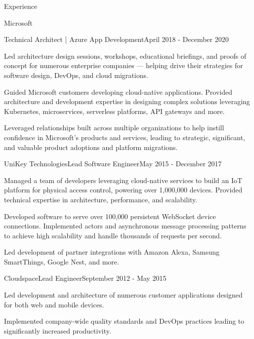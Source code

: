 \documentclass{resume} %
\begin{document}
\begin{rSection}{Experience}
\begin{rSubsection}{Microsoft}{}{}
\begin{rSubSubsection}{Technical Architect | Azure App Development}{April 2018 - December 2020}{}{}
        \item Led architecture design sessions, workshops, educational briefings, and proofs of concept for numerous enterprise companies --- helping drive their strategies for software design, DevOps, and cloud migrations.
        \item Guided Microsoft customers developing cloud-native applications.  Provided architecture and development expertise in designing complex solutions leveraging Kubernetes, microservices, serverless platforms, API gateways and more.
        \item Leveraged relationships built across multiple organizations to help instill confidence in Microsoft's products and services, leading to strategic, significant, and valuable product adoptions and platform migrations.
        
    \end{rSubSubsection}
    
    
\end{rSubsection}


\begin{rSubsection}{UniKey Technologies}{Lead Software Engineer}{May 2015 - December 2017}

\item Managed a team of developers leveraging cloud-native services to build an IoT platform for physical access control, powering over 1,000,000 devices.  Provided technical expertise in architecture, performance, and scalability.
\item Developed software to serve over 100,000 persistent WebSocket device connections. Implemented actors and asynchronous message processing patterns to achieve high scalability and handle thousands of requests per second.
\item Led development of partner integrations with Amazon Alexa, Samsung SmartThings, Google Nest, and more.

\end{rSubsection}


\begin{rSubsection}{Cloudspace}{Lead Engineer}{September 2012 - May 2015}

\item Led development and architecture of numerous customer applications designed for both web and mobile devices.
\item Implemented company-wide quality standards and DevOps practices leading to significantly increased productivity.
    

\end{rSubsection}
\end{rSection}
\end{document}
